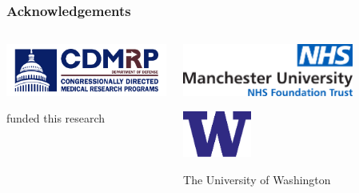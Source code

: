 \documentclass{beamer}
\begin{document}
\begin{frame}
    \frametitle{Acknowledgements}
    \begin{columns}
        \begin{column}{0.5\textwidth}
        \includegraphics[width=\textwidth]{figures/cdmrp_logo_03.png}

        funded this research
        \end{column}
        \begin{column}{0.5\textwidth}
        \includegraphics[width=0.75\textwidth]{figures/MFT-logo}

        \includegraphics[width=0.3\textwidth]{figures/W-Logo_Purple1}

        The University of Washington
        \end{column}
    \end{columns}
    \begin{columns}
        \begin{column}{0.5\textwidth}
        


\end{column}
\end{columns}
\end{frame}
\end{document}
